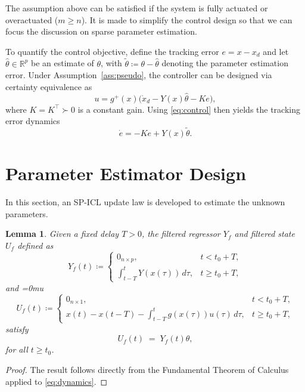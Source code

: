 \documentclass[conference]{ieeeconf}
\newtheorem{lemma}{Lemma}
\begin{document}
The assumption above can be satisfied if the system is fully actuated or overactuated ($m \geq n$). It is made to simplify the control design so that we can focus the discussion on sparse parameter estimation.

To quantify the control objective, define the tracking error $e = x - x_d$ and let $\hat{\theta} \in \mathbb{R}^p$ be an estimate of $\theta$, with $\tilde{\theta} \coloneqq \theta - \hat{\theta}$ denoting the parameter estimation error. Under Assumption~\ref{ass:pseudo}, the controller can be designed via certainty equivalence as
\begin{equation}\label{eq:control}
u = g^+(x)\big(\dot{x}_d - Y(x)\hat{\theta} - K e\big),
\end{equation}
where $K = K^\top \succ 0$ is a constant gain. Using \eqref{eq:control} then yields the tracking error dynamics
\begin{equation}\label{eq:closed_error}
\dot{e} = -K e + Y(x)\tilde{\theta}.
\end{equation}

\section{Parameter Estimator Design}
\label{section:parameterEstimator}

In this section, an SP-ICL update law is developed to estimate the unknown parameters.

\begin{lemma}\label{lem:ErrorTermformulation}
Given a fixed delay $T>0$, the filtered regressor $Y_f$ and filtered state $U_f$  defined as
\begin{equation*}
    Y_f(t) \coloneqq 
    \begin{cases} 
      0_{n \times p}, & t < t_0+T, \\
      \int_{t-T}^{t} Y(x(\tau))\,d\tau, & t \ge t_0 +T,
    \end{cases}
\end{equation*}
and
\begingroup\medmuskip=0mu\begin{equation*}
    U_f(t) \coloneqq 
    \begin{cases} 
      0_{n \times 1}, & t < t_0 + T,\\
      x(t) - x(t - T) - \int_{t-T}^{t} g(x(\tau))u(\tau)\,d\tau, & t \ge t_0 + T,
    \end{cases}
\end{equation*}\endgroup
satisfy
\begin{equation}\label{eq:incrementalRelation}
    U_f(t) \;=\; Y_f(t)\theta,
\end{equation}
for all $t\ge t_0$.
\end{lemma}
\begin{proof}
The result follows directly from the Fundamental Theorem of Calculus applied to \eqref{eq:dynamics}.
\end{proof}
\end{document}
